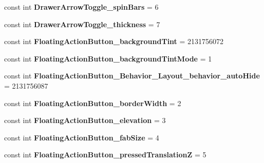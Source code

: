 \begin{DoxyCompactItemize}
const int {\bfseries Drawer\+Arrow\+Toggle\+\_\+spin\+Bars} = 6
\item 
\mbox{\label{classst_delivery_1_1_resource_1_1_styleable_ae7c5af59eabba25ac9e8e1114a9c47b3}} 
const int {\bfseries Drawer\+Arrow\+Toggle\+\_\+thickness} = 7
\item 
\mbox{\label{classst_delivery_1_1_resource_1_1_styleable_a2774c7251bf2dba7fa9dd9421fab0e71}} 
const int {\bfseries Floating\+Action\+Button\+\_\+background\+Tint} = 2131756072
\item 
\mbox{\label{classst_delivery_1_1_resource_1_1_styleable_a47af5308bbd327e5481c947cc480d96d}} 
const int {\bfseries Floating\+Action\+Button\+\_\+background\+Tint\+Mode} = 1
\item 
\mbox{\label{classst_delivery_1_1_resource_1_1_styleable_a977e6f793abdd49d13d0fd03819f2335}} 
const int {\bfseries Floating\+Action\+Button\+\_\+\+Behavior\+\_\+\+Layout\+\_\+behavior\+\_\+auto\+Hide} = 2131756087
\item 
\mbox{\label{classst_delivery_1_1_resource_1_1_styleable_a48aba41b134e43ae1d4feca91aca1b29}} 
const int {\bfseries Floating\+Action\+Button\+\_\+border\+Width} = 2
\item 
\mbox{\label{classst_delivery_1_1_resource_1_1_styleable_a4744c61a3c575bad68cacea0fa9189eb}} 
const int {\bfseries Floating\+Action\+Button\+\_\+elevation} = 3
\item 
\mbox{\label{classst_delivery_1_1_resource_1_1_styleable_ae610c9ad4d8f1d18bcf420508e5b9558}} 
const int {\bfseries Floating\+Action\+Button\+\_\+fab\+Size} = 4
\item 
\mbox{\label{classst_delivery_1_1_resource_1_1_styleable_ae20e767ea352dad7ef080b3add9578e5}} 
const int {\bfseries Floating\+Action\+Button\+\_\+pressed\+TranslationZ} = 5
\item 
\mbox{\label{classst_delivery_1_1_resource_1_1_styleable_ad55e0754bc7516becdc1916cb3d96ee8}} 

\end{DoxyCompactItemize}
